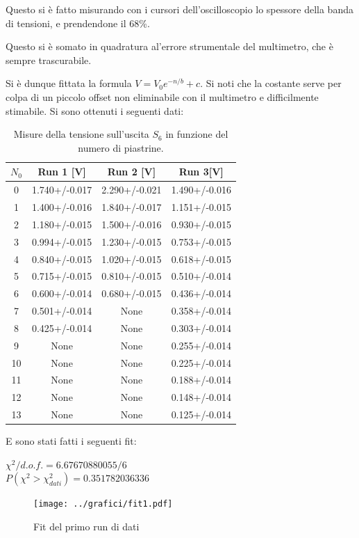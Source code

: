 \documentclass[a4paper,10pt]{article}
\begin{document}
Questo si è fatto misurando con i cursori dell'oscilloscopio lo spessore della banda di tensioni, e prendendone il 68\%.   


Questo si è somato in quadratura al'errore strumentale del multimetro, che è sempre trascurabile. 

Si è dunque fittata la formula $V=V_0e^{-n/b}+c$. Si noti che la costante serve per colpa di un piccolo offset non eliminabile con il multimetro e difficilmente stimabile. Si sono ottenuti i seguenti dati:

\begin{table}[H]
	\centering
	\begin{tabular}{cccc}
		$ N_0 $ & Run 1 [V]& Run 2 [V]& Run 3[V]\\
		\hline
		0 & 1.740+/-0.017 & 2.290+/-0.021 & 1.490+/-0.016\\
		1 & 1.400+/-0.016 & 1.840+/-0.017 & 1.151+/-0.015\\
		2 & 1.180+/-0.015 & 1.500+/-0.016 & 0.930+/-0.015\\
		3 & 0.994+/-0.015 & 1.230+/-0.015 & 0.753+/-0.015\\
		4 & 0.840+/-0.015 & 1.020+/-0.015 & 0.618+/-0.015\\
		5 & 0.715+/-0.015 & 0.810+/-0.015 & 0.510+/-0.014\\
		6 & 0.600+/-0.014 & 0.680+/-0.015 & 0.436+/-0.014\\
		7 & 0.501+/-0.014 & None & 0.358+/-0.014\\
		8 & 0.425+/-0.014 & None & 0.303+/-0.014\\
		9 & None & None & 0.255+/-0.014\\
		10 & None & None & 0.225+/-0.014\\
		11 & None & None & 0.188+/-0.014\\
		12 & None & None & 0.148+/-0.014\\
		13 & None & None & 0.125+/-0.014\\	
	\end{tabular}
\caption{Misure della tensione sull'uscita $ S_6 $ in funzione del numero di piastrine.}
\label{tab:s6}
\end{table}

E sono stati fatti i seguenti fit:

$\chi^2/d.o.f.=6.67670880055/6$ \\
$P(\chi^2>\chi^2_{dati})=0.351782036336$\\ 

\begin{figure}[H]
	\centering
	\texttt{[image: ../grafici/fit1.pdf]}
	\caption{Fit del primo run di dati}
	\label{fig:RUN1}
\end{figure}
\end{document}
